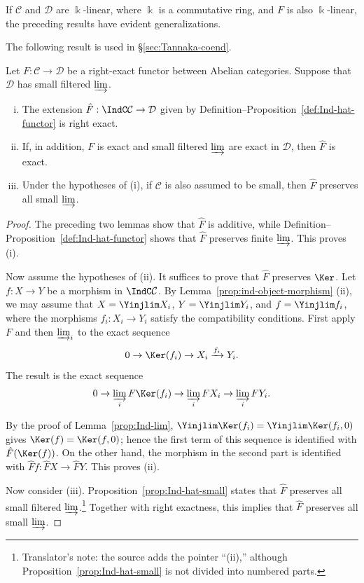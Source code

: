 If $\mathcal{C}$ and $\mathcal{D}$ are $\Bbbk$-linear, where $\Bbbk$ is a commutative ring, and $F$ is also $\Bbbk$-linear, the preceding results have evident generalizations.

The following result is used in \S\ref{sec:Tannaka-coend}.

\begin{proposition}\label{prop:Ind-ext-exactness}
	Let $F:\mathcal{C}\to\mathcal{D}$ be a right-exact functor between Abelian categories. Suppose that $\mathcal{D}$ has small filtered $\varinjlim$.
	\begin{enumerate}[(i)]
		\item The extension $\hat{F}:\IndC\mathcal{C}\to\mathcal{D}$ given by Definition--Proposition~\ref{def:Ind-hat-functor} is right exact.
		\item If, in addition, $F$ is exact and small filtered $\varinjlim$ are exact in $\mathcal{D}$, then $\hat{F}$ is exact.
		\item Under the hypotheses of (i), if $\mathcal{C}$ is also assumed to be small, then $\hat{F}$ preserves all small $\varinjlim$.
	\end{enumerate}
\end{proposition}
\begin{proof}
	The preceding two lemmas show that $\hat{F}$ is additive, while Definition--Proposition~\ref{def:Ind-hat-functor} shows that $\hat{F}$ preserves finite $\varinjlim$. This proves (i).

	Now assume the hypotheses of (ii). It suffices to prove that $\hat{F}$ preserves $\Ker$. Let $f:X\to Y$ be a morphism in $\IndC\mathcal{C}$. By Lemma~\ref{prop:ind-object-morphism} (ii), we may assume that $X=\Yinjlim X_i$, $Y=\Yinjlim Y_i$, and $f=\Yinjlim f_i$, where the morphisms $f_i:X_i\to Y_i$ satisfy the compatibility conditions. First apply $F$ and then $\varinjlim_i$ to the exact sequence
	\[ 0 \to \Ker(f_i) \to X_i \xrightarrow{f_i} Y_i. \]
	The result is the exact sequence
	\[ 0 \to \varinjlim_i F\Ker(f_i) \to \varinjlim_i FX_i \to \varinjlim_i FY_i. \]

	By the proof of Lemma~\ref{prop:Ind-lim}, $\Yinjlim\Ker(f_i)=\Yinjlim\Ker(f_i,0)$ gives $\Ker(f)=\Ker(f,0)$; hence the first term of this sequence is identified with $\hat{F}(\Ker(f))$. On the other hand, the morphism in the second part is identified with $\hat{F}f:\hat{F}X\to\hat{F}Y$. This proves (ii).

	Now consider (iii). Proposition~\ref{prop:Ind-hat-small} states that $\hat{F}$ preserves all small filtered $\varinjlim$.\footnote{Translator's note: the source adds the pointer ``(ii),'' although Proposition~\ref{prop:Ind-hat-small} is not divided into numbered parts.} Together with right exactness, this implies that $\hat{F}$ preserves all small $\varinjlim$.
\end{proof}

